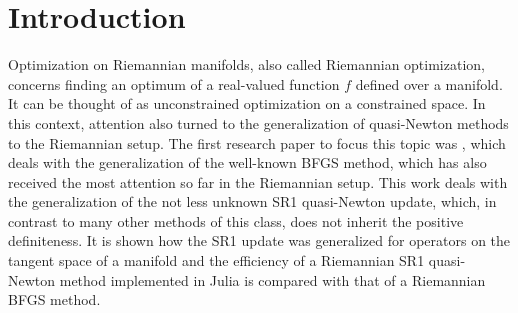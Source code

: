 \chapter{Introduction}

Optimization on Riemannian manifolds, also called Riemannian optimization, concerns finding an optimum of a real-valued function $f$ defined over a manifold. It can be thought of as unconstrained optimization on a constrained space. In this context, attention also turned to the generalization of quasi-Newton methods to the Riemannian setup. The first research paper to focus this topic was \cite{Gabay:1982}, which deals with the generalization of the well-known BFGS method, which has also received the most attention so far in the Riemannian setup. This work deals with the generalization of the not less unknown SR1 quasi-Newton update, which, in contrast to many other methods of this class, does not inherit the positive definiteness. It is shown how the SR1 update was generalized for operators on the tangent space of a manifold and the efficiency of a Riemannian SR1 quasi-Newton method implemented in Julia is compared with that of a Riemannian BFGS method.

